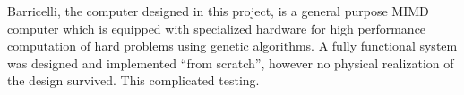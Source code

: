 
Barricelli, the computer designed in this project, is a general purpose MIMD computer which is equipped with specialized hardware for high performance computation of hard problems using genetic algorithms.
A fully functional system was designed and implemented ``from scratch'', however no physical realization of the design survived.
This complicated testing.


